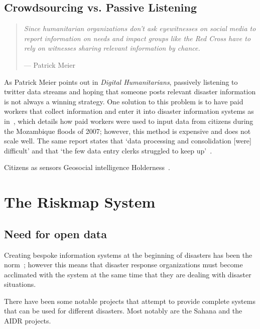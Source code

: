 \subsection{Crowdsourcing vs. Passive Listening}
\begin{quote}
	\textit{Since humanitarian organizations
	don't ask eyewitnesses on social media to report information on needs
	and impact groups like the Red Cross have to rely on witnesses sharing
	relevant information by chance.}
		\begin{flushright}
		--- Patrick Meier~\cite{meierDigitalHumanitariansHow2015}
		\end{flushright}
\end{quote}

As Patrick Meier points out in \textit{Digital Humanitarians}, passively
listening to twitter data streams and hoping that someone posts relevant
disaster information is not always a winning strategy. One solution to this
problem is to have paid workers that collect information and enter it into
disaster information systems as in~\cite{aminDataNaturalDisasters2008}, which
details how paid workers were used to input data from citizens during the
Mozambique floods of 2007; however, this method is expensive and does not scale
well. The same report states that `data processing and consolidation [were]
difficult' and that `the few data entry clerks struggled to keep
up'~\cite{aminDataNaturalDisasters2008}.


Citizens as sensors Geosocial
intelligence Holderness~\cite{holdernessSocialMediaGeoSocial2015a}.

\section{The Riskmap System}\label{chap1:riskmap}

	\subsection{Need for open data}
	Creating bespoke information systems at the beginning of disasters has been the
	norm~\cite{aminDataNaturalDisasters2008}; however this
	means that disaster response organizations must become acclimated with the
	system at the same time that they are dealing with disaster situations. 
	
	There have been some notable projects that attempt to provide complete systems
	that can be used for different disasters. Most notably are the Sahana and the
	AIDR projects.

